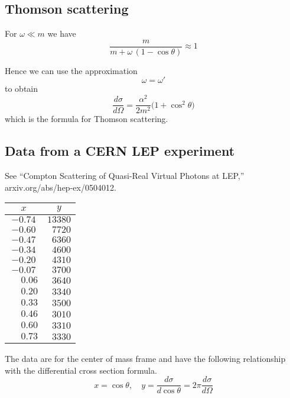 \documentclass[12pt]{article}
\begin{document}
\subsection*{Thomson scattering}
For $\omega\ll m$ we have
\begin{equation*}
\frac{m}{m+\omega\,(1-\cos\theta)}\approx1
\end{equation*}

Hence we can use the approximation
\begin{equation*}
\omega=\omega'
\end{equation*}
to obtain
\begin{equation*}
\frac{d\sigma}{d\Omega}=\frac{\alpha^2}{2m^2}\big(1+\cos^2\theta\big)
\end{equation*}
which is the formula for Thomson scattering.

\subsection*{Data from a CERN LEP experiment}
See ``Compton Scattering of Quasi-Real Virtual Photons at LEP,''
arxiv.org/abs/hep-ex/0504012.

\begin{center}
\begin{tabular}{|c|c|}
\hline
$x$ & $y$\\
\hline
$-0.74$ & $13380$\\
$-0.60$ & $\phantom{0}7720$\\
$-0.47$ & $\phantom{0}6360$\\
$-0.34$ & $\phantom{0}4600$\\
$-0.20$ & $\phantom{0}4310$\\
$-0.07$ & $\phantom{0}3700$\\
$\phantom{+}0.06$ & $\phantom{0}3640$\\
$\phantom{+}0.20$ & $\phantom{0}3340$\\
$\phantom{+}0.33$ & $\phantom{0}3500$\\
$\phantom{+}0.46$ & $\phantom{0}3010$\\
$\phantom{+}0.60$ & $\phantom{0}3310$\\
$\phantom{+}0.73$ & $\phantom{0}3330$\\
\hline
\end{tabular}
\end{center}

\noindent
The data are for the center of mass frame and have the following relationship with the differential cross section formula.
\begin{equation*}
x=\cos\theta,
\quad
y=\frac{d\sigma}{d\cos\theta}=2\pi\frac{d\sigma}{d\Omega}
\end{equation*}
\end{document}
